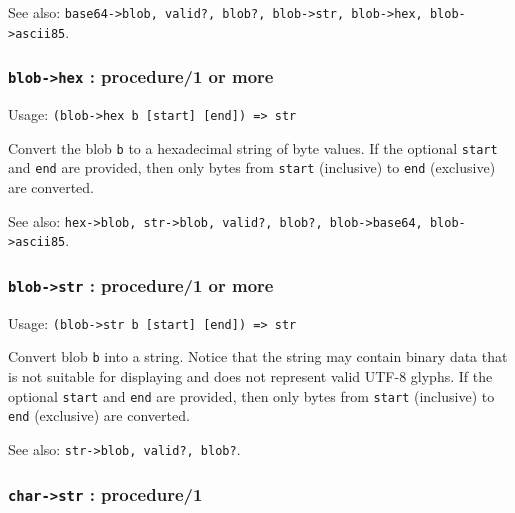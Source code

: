 \documentclass[
]{article}
\newcommand{\passthrough}[1]{#1}
\begin{document}
See also:
\passthrough{\lstinline!base64->blob, valid?, blob?, blob->str, blob->hex, blob->ascii85!}.

\hypertarget{blob-hex-procedure1-or-more}{%
\subsubsection{\texorpdfstring{\texttt{blob-\textgreater{}hex} :
procedure/1 or
more}{blob-\textgreater hex : procedure/1 or more}}\label{blob-hex-procedure1-or-more}}

Usage: \passthrough{\lstinline!(blob->hex b [start] [end]) => str!}

Convert the blob \passthrough{\lstinline!b!} to a hexadecimal string of
byte values. If the optional \passthrough{\lstinline!start!} and
\passthrough{\lstinline!end!} are provided, then only bytes from
\passthrough{\lstinline!start!} (inclusive) to
\passthrough{\lstinline!end!} (exclusive) are converted.

See also:
\passthrough{\lstinline!hex->blob, str->blob, valid?, blob?, blob->base64, blob->ascii85!}.

\hypertarget{blob-str-procedure1-or-more}{%
\subsubsection{\texorpdfstring{\texttt{blob-\textgreater{}str} :
procedure/1 or
more}{blob-\textgreater str : procedure/1 or more}}\label{blob-str-procedure1-or-more}}

Usage: \passthrough{\lstinline!(blob->str b [start] [end]) => str!}

Convert blob \passthrough{\lstinline!b!} into a string. Notice that the
string may contain binary data that is not suitable for displaying and
does not represent valid UTF-8 glyphs. If the optional
\passthrough{\lstinline!start!} and \passthrough{\lstinline!end!} are
provided, then only bytes from \passthrough{\lstinline!start!}
(inclusive) to \passthrough{\lstinline!end!} (exclusive) are converted.

See also: \passthrough{\lstinline!str->blob, valid?, blob?!}.

\hypertarget{char-str-procedure1}{%
\subsubsection{\texorpdfstring{\texttt{char-\textgreater{}str} :
procedure/1}{char-\textgreater str : procedure/1}}\label{char-str-procedure1}}
\end{document}
